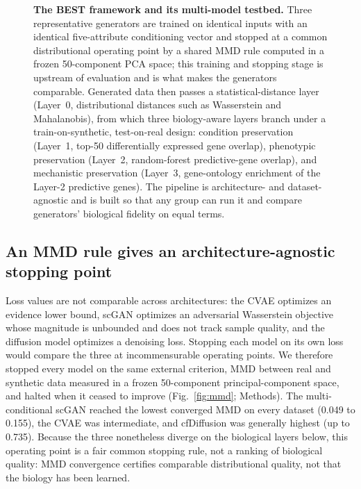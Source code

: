 \documentclass[11pt]{article}
\newcommand{\fides}{BEST}
\begin{document}
\begin{figure}[t]
{}
\caption{\textbf{The \fides{} framework and its multi-model testbed.} Three representative generators are trained on identical inputs with an identical five-attribute conditioning vector and stopped at a common distributional operating point by a shared MMD rule computed in a frozen 50-component PCA space; this training and stopping stage is upstream of evaluation and is what makes the generators comparable. Generated data then passes a statistical-distance layer (Layer~0, distributional distances such as Wasserstein and Mahalanobis), from which three biology-aware layers branch under a train-on-synthetic, test-on-real design: condition preservation (Layer~1, top-50 differentially expressed gene overlap), phenotypic preservation (Layer~2, random-forest predictive-gene overlap), and mechanistic preservation (Layer~3, gene-ontology enrichment of the Layer-2 predictive genes). The pipeline is architecture- and dataset-agnostic and is built so that any group can run it and compare generators' biological fidelity on equal terms.}
\label{fig:framework}
\end{figure}

\subsection{An MMD rule gives an architecture-agnostic stopping point}
Loss values are not comparable across architectures: the CVAE optimizes an evidence lower bound, scGAN optimizes an adversarial Wasserstein objective whose magnitude is unbounded and does not track sample quality, and the diffusion model optimizes a denoising loss. Stopping each model on its own loss would compare the three at incommensurable operating points. We therefore stopped every model on the same external criterion, MMD between real and synthetic data measured in a frozen 50-component principal-component space, and halted when it ceased to improve (Fig.~\ref{fig:mmd}; Methods). The multi-conditional scGAN reached the lowest converged MMD on every dataset (0.049 to 0.155), the CVAE was intermediate, and cfDiffusion was generally highest (up to 0.735). Because the three nonetheless diverge on the biological layers below, this operating point is a fair common stopping rule, not a ranking of biological quality: MMD convergence certifies comparable distributional quality, not that the biology has been learned.
\end{document}
